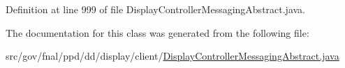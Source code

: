 Definition at line 999 of file Display\-Controller\-Messaging\-Abstract.\-java.



The documentation for this class was generated from the following file\-:\begin{DoxyCompactItemize}
\item 
src/gov/fnal/ppd/dd/display/client/\hyperlink{DisplayControllerMessagingAbstract_8java}{Display\-Controller\-Messaging\-Abstract.\-java}\end{DoxyCompactItemize}
